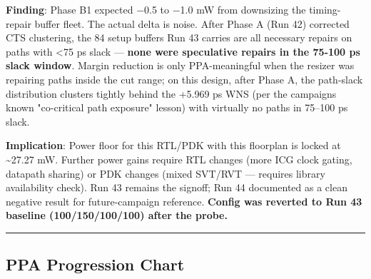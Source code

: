 \begin{record}
\textbf{Finding}: Phase B1 expected −0.5 to −1.0 mW from downsizing the
timing-repair buffer fleet. The actual delta is noise. After Phase A
(Run 42) corrected CTS clustering, the 84 setup buffers Run 43 carries
are all necessary repairs on paths with \textless75 ps slack ---
\textbf{none were speculative repairs in the 75-100 ps slack window}.
Margin reduction is only PPA-meaningful when the resizer was repairing
paths inside the cut range; on this design, after Phase A, the
path-slack distribution clusters tightly behind the +5.969 ps WNS (per
the campaign\textquotesingle s known "co-critical path exposure" lesson)
with virtually no paths in 75--100 ps slack.

\textbf{Implication}: Power floor for this RTL/PDK with this floorplan
is locked at \textasciitilde27.27 mW. Further power gains require RTL
changes (more ICG clock gating, datapath sharing) or PDK changes (mixed
SVT/RVT --- requires library availability check). Run 43 remains the
signoff; Run 44 documented as a clean negative result for
future-campaign reference. \textbf{Config was reverted to Run 43
baseline (100/\allowbreak{}150/\allowbreak{}100/\allowbreak{}100) after
the probe.}

\begin{center}\rule{0.5\linewidth}{0.5pt}\end{center}

\end{record}

\subsection{PPA Progression Chart}\label{cr:run:asap7:ppa-progression-chart}

